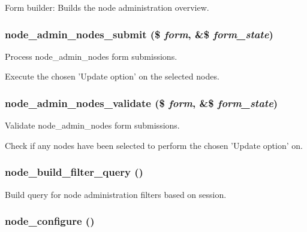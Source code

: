 Form builder: Builds the node administration overview. \hypertarget{node_8admin_8inc_5f159cfed0d6cce65d5d70747efec391}{
\subsubsection[{node\_\-admin\_\-nodes\_\-submit}]{\setlength{\rightskip}{0pt plus 5cm}node\_\-admin\_\-nodes\_\-submit (\$ {\em form}, \/  \&\$ {\em form\_\-state})}}
\label{node_8admin_8inc_5f159cfed0d6cce65d5d70747efec391}


Process node\_\-admin\_\-nodes form submissions.

Execute the chosen 'Update option' on the selected nodes. \hypertarget{node_8admin_8inc_32a9ea91250aaf84de44f784a3569944}{
\subsubsection[{node\_\-admin\_\-nodes\_\-validate}]{\setlength{\rightskip}{0pt plus 5cm}node\_\-admin\_\-nodes\_\-validate (\$ {\em form}, \/  \&\$ {\em form\_\-state})}}
\label{node_8admin_8inc_32a9ea91250aaf84de44f784a3569944}


Validate node\_\-admin\_\-nodes form submissions.

Check if any nodes have been selected to perform the chosen 'Update option' on. \hypertarget{node_8admin_8inc_f8309df77c5a2bd9fc4bbafbc57b77cb}{
\subsubsection[{node\_\-build\_\-filter\_\-query}]{\setlength{\rightskip}{0pt plus 5cm}node\_\-build\_\-filter\_\-query ()}}
\label{node_8admin_8inc_f8309df77c5a2bd9fc4bbafbc57b77cb}


Build query for node administration filters based on session. \hypertarget{node_8admin_8inc_166b7491e7493feafd6ae178ebcc238c}{
\subsubsection[{node\_\-configure}]{\setlength{\rightskip}{0pt plus 5cm}node\_\-configure ()}}
\label{node_8admin_8inc_166b7491e7493feafd6ae178ebcc238c}


